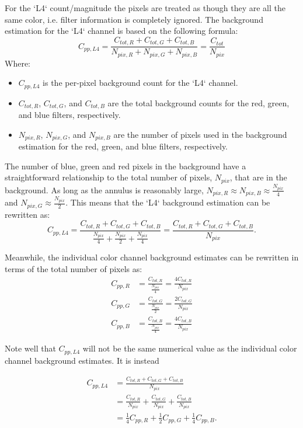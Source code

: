 \documentclass[12pt]{article}
\begin{document}
For the `L4` count/magnitude the pixels are treated as though they are all
the same color, i.e. filter information is completely ignored. The
background estimation for the `L4` channel is based on the following formula:
\begin{equation}
C_{pp, L4} = \frac{C_{tot, R} + C_{tot, G} + C_{tot, B}}{N_{pix, R} + N_{pix, G} + N_{pix, B}} = \frac{C_{tot}}{N_{pix}}
\end{equation}
Where:
\begin{itemize}
    \item $C_{pp, L4}$ is the per-pixel background count for the `L4` channel.
    \item $C_{tot, R}$, $C_{tot, G}$, and $C_{tot, B}$ are the total background
      counts for the red, green, and blue filters, respectively.
    \item $N_{pix, R}$, $N_{pix, G}$, and $N_{pix, B}$ are the number of pixels used in the background estimation for the red, green, and blue filters, respectively.
\end{itemize}

The number of blue, green and red pixels in the background have a straightforward relationship to the total number of pixels, $N_{pix}$, that are in the background. As long as the annulus is reasonably large, $N_{pix,R} \approx N_{pix, B} \approx \frac{N_{pix}}{4}$ and $N_{pix, G} \approx \frac{N_{pix}}{2}$. This means that the `L4` background estimation can be rewritten as:
\begin{equation}
C_{pp, L4} = \frac{C_{tot, R} + C_{tot, G} + C_{tot, B}}{\frac{N_{pix}}{4} + \frac{N_{pix}}{2} + \frac{N_{pix}}{4}} = \frac{C_{tot, R} + C_{tot, G} + C_{tot, B}}{N_{pix}}.
\end{equation}

Meanwhile, the individual color channel background estimates can be rewritten in terms of the total number of pixels as:
\begin{align}
C_{pp, R} &= \frac{C_{tot, R}}{\frac{N_{pix}}{4}} = \frac{4C_{tot, R}}{N_{pix}}\\
C_{pp, G} &= \frac{C_{tot, G}}{\frac{N_{pix}}{2}} = \frac{2C_{tot, G}}{N_{pix}}\\
C_{pp, B} &= \frac{C_{tot, B}}{\frac{N_{pix}}{4}} = \frac{4C_{tot, B}}{N_{pix}}
\end{align}

Note well that $C_{pp, L4}$ will not be the same numerical value as the individual color channel background estimates. It is instead

\begin{align}
C_{pp, L4} &=    \frac{C_{tot, R} + C_{tot, G} + C_{tot, B}}{N_{pix}} \\
            &= \frac{C_{tot,R}}{N_{pix}} + \frac{C_{tot, G}}{N_{pix}} + \frac{C_{tot, B}}{N_{pix}} \\
            &= \frac{1}{4}C_{pp, R} + \frac{1}{2}C_{pp, G} + \frac{1}{4}C_{pp, B}. \label{eq:L4-background-weighted-average}
\end{align}
\end{document}
